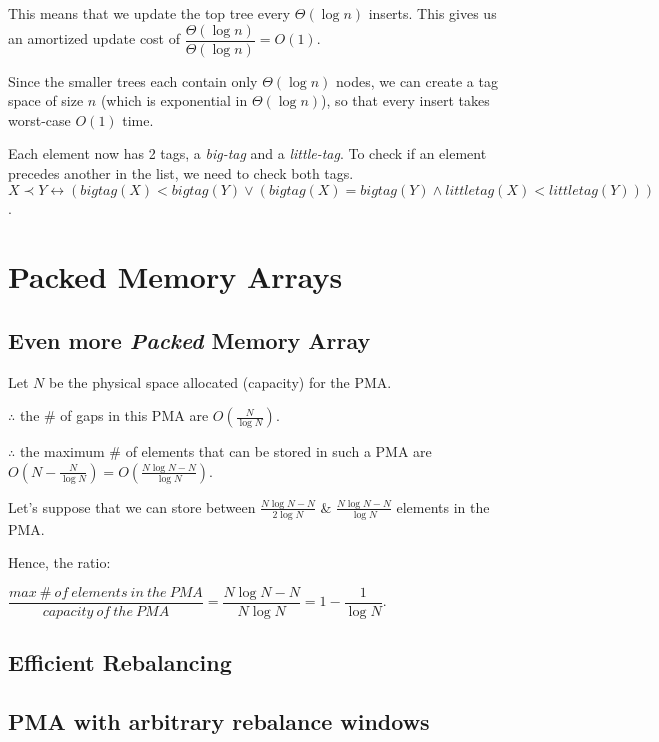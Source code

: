 \documentclass{article}
\begin{document}
This means that we update the top tree every $\Theta(\log{n})$
inserts. This gives us an amortized update cost of
$\dfrac{\Theta(\log{n})}{\Theta(\log{n})} = O(1)$.

Since the smaller trees each contain only $\Theta(\log{n})$ nodes, we
can create a tag space of size $n$ (which is exponential in
$\Theta(\log{n})$), so that every insert takes worst-case $O(1)$ time.

Each element now has 2 tags, a \textit{big-tag} and a
\textit{little-tag}. To check if an element precedes another in the
list, we need to check both tags. $X \prec Y \leftrightarrow
(bigtag(X) < bigtag(Y) \vee (bigtag(X) = bigtag(Y) \wedge littletag(X)
< littletag(Y)))$.

\clearpage

\section{Packed Memory Arrays}

\subsection{Even more \textit{Packed} Memory Array}

Let $N$ be the physical space allocated (capacity) for the PMA.

$\therefore$ the \# of gaps in this PMA are $O(\frac{N}{\log{N}})$.

$\therefore$ the maximum \# of elements that can be stored in such a
PMA are $O(N - \frac{N}{\log{N}}) = O(\frac{N\log{N} - N}{\log{N}})$.

Let's suppose that we can store between $\frac{N\log{N} - N}{2\log{N}}$ \&
$\frac{N\log{N} - N}{\log{N}}$ elements in the PMA.

Hence, the ratio:

$\dfrac{max\ \#\ of\ elements\ in\ the\ PMA}{capacity\ of\ the\ PMA}
= \dfrac{N\log{N} - N}{N\log{N}} = 1 - \dfrac{1}{\log{N}}$.

\subsection{Efficient Rebalancing}

\subsection{PMA with arbitrary rebalance windows}

\clearpage
\end{document}
